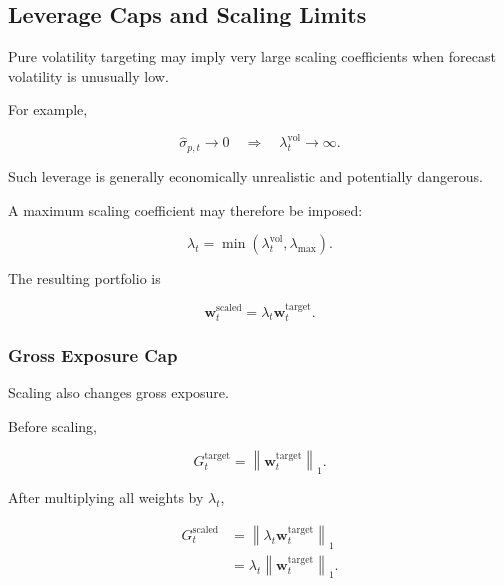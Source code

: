\documentclass[11pt,a4paper]{article}
\begin{document}
\subsection{Leverage Caps and Scaling Limits}
\label{subsec:leverage_caps_scaling}

Pure volatility targeting may imply very large scaling coefficients when
forecast volatility is unusually low.

For example,

\begin{equation}
\widehat{\sigma}_{p,t}
\rightarrow 0
\quad\Rightarrow\quad
\lambda_t^{\mathrm{vol}}
\rightarrow\infty.
\end{equation}

Such leverage is generally economically unrealistic and potentially dangerous.

A maximum scaling coefficient may therefore be imposed:

\begin{equation}
\boxed{
\lambda_t
=
\min
\left(
\lambda_t^{\mathrm{vol}},
\lambda_{\max}
\right).
}
\end{equation}

The resulting portfolio is

\begin{equation}
\mathbf{w}_t^{\mathrm{scaled}}
=
\lambda_t
\mathbf{w}_t^{\mathrm{target}}.
\end{equation}


\subsubsection{Gross Exposure Cap}

Scaling also changes gross exposure.

Before scaling,

\begin{equation}
G_t^{\mathrm{target}}
=
\left\|
\mathbf{w}_t^{\mathrm{target}}
\right\|_1.
\end{equation}

After multiplying all weights by $\lambda_t$,

\begin{equation}
\begin{aligned}
G_t^{\mathrm{scaled}}
&=
\left\|
\lambda_t
\mathbf{w}_t^{\mathrm{target}}
\right\|_1
\\
&=
\lambda_t
\left\|
\mathbf{w}_t^{\mathrm{target}}
\right\|_1.
\end{aligned}
\end{equation}
\end{document}
